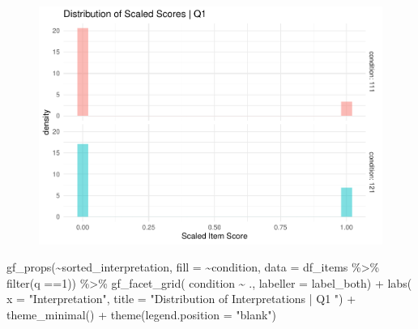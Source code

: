 \documentclass[
  letterpaper,
  DIV=11,
  numbers=noendperiod]{scrreprt}
\newenvironment{Shaded}{\begin{snugshade}}{\end{snugshade}}
\newcommand{\AttributeTok}[1]{\textcolor[rgb]{0.40,0.45,0.13}{#1}}
\newcommand{\DecValTok}[1]{\textcolor[rgb]{0.68,0.00,0.00}{#1}}
\newcommand{\FunctionTok}[1]{\textcolor[rgb]{0.28,0.35,0.67}{#1}}
\newcommand{\NormalTok}[1]{\textcolor[rgb]{0.00,0.23,0.31}{#1}}
\newcommand{\SpecialCharTok}[1]{\textcolor[rgb]{0.37,0.37,0.37}{#1}}
\newcommand{\StringTok}[1]{\textcolor[rgb]{0.13,0.47,0.30}{#1}}
\begin{document}
\begin{figure}[H]

{\centering \includegraphics{analysis/SGC3A/2_sgc3A_scoring_files/figure-pdf/Q1-distribution-1.pdf}

}

\end{figure}

\begin{Shaded}
\begin{Highlighting}[]
\FunctionTok{gf\_props}\NormalTok{(}\SpecialCharTok{\textasciitilde{}}\NormalTok{sorted\_interpretation, }\AttributeTok{fill =} \SpecialCharTok{\textasciitilde{}}\NormalTok{condition, }\AttributeTok{data =}\NormalTok{ df\_items }\SpecialCharTok{\%\textgreater{}\%} \FunctionTok{filter}\NormalTok{(q }\SpecialCharTok{==}\DecValTok{1}\NormalTok{)) }\SpecialCharTok{\%\textgreater{}\%} 
  \FunctionTok{gf\_facet\_grid}\NormalTok{( condition }\SpecialCharTok{\textasciitilde{}}\NormalTok{ ., }\AttributeTok{labeller =}\NormalTok{ label\_both) }\SpecialCharTok{+} 
  \FunctionTok{labs}\NormalTok{( }\AttributeTok{x =} \StringTok{"Interpretation"}\NormalTok{, }\AttributeTok{title =} \StringTok{"Distribution of Interpretations | Q1 "}\NormalTok{) }\SpecialCharTok{+} 
  \FunctionTok{theme\_minimal}\NormalTok{() }\SpecialCharTok{+} \FunctionTok{theme}\NormalTok{(}\AttributeTok{legend.position =} \StringTok{"blank"}\NormalTok{)}
\end{Highlighting}
\end{Shaded}
\end{document}
